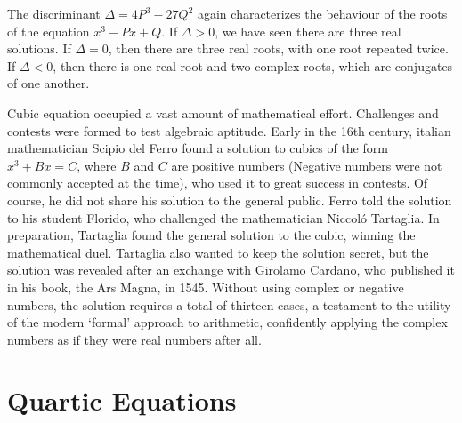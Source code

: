 \begin{remark}
	The discriminant $\Delta = 4P^3 - 27Q^2$ again characterizes the behaviour of the roots of the equation $x^3 - Px + Q$. If $\Delta > 0$, we have seen there are three real solutions. If $\Delta = 0$, then there are three real roots, with one root repeated twice. If $\Delta < 0$, then there is one real root and two complex roots, which are conjugates of one another.
\end{remark}

Cubic equation occupied a vast amount of mathematical effort. Challenges and contests were formed to test algebraic aptitude. Early in the 16th century, italian mathematician Scipio del Ferro found a solution to cubics of the form $x^3 + Bx = C$, where $B$ and $C$ are positive numbers (Negative numbers were not commonly accepted at the time), who used it to great success in contests. Of course, he did not share his solution to the general public. Ferro told the solution to his student Florido, who challenged the mathematician Niccol\'{o} Tartaglia. In preparation, Tartaglia found the general solution to the cubic, winning the mathematical duel. Tartaglia also wanted to keep the solution secret, but the solution was revealed after an exchange with Girolamo Cardano, who published it in his book, the Ars Magna, in 1545. Without using complex or negative numbers, the solution requires a total of thirteen cases, a testament to the utility of the modern `formal' approach to arithmetic, confidently applying the complex numbers as if they were real numbers after all.

\section{Quartic Equations}

